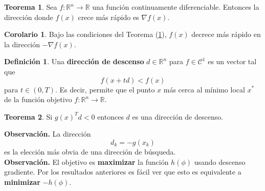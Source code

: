 \documentclass[11pt,letterpaper]{article}
\theoremstyle{definition}
\newtheorem{defi}{Definición}[section]%
\theoremstyle{definition}
\newtheorem{teo}{Teorema}[section]%
\theoremstyle{definition}
\newtheorem{col}{Corolario}[section]
\begin{document}
\begin{shaded*}
\begin{teo}\label{max_}
	Sea $ f: \mathbb{R}^n \to \mathbb{R} $ una función continuamente diferenciable. Entonces la dirección donde $ f(x) $ crece más rápido es $ \nabla f(x) $.
\end{teo}
\end{shaded*}

\begin{col}
	Bajo las condiciones del Teorema (\ref{max_}), $ f(x) $ decrece más rápido en la dirección $ - \nabla f(x) $.
\end{col}

\begin{shaded*}
\begin{defi}
	Una \textbf{dirección de descenso} $ d \in \mathbb{R}^n $ para $ f \in \mathcal{C}^1 $ es un vector tal que
	\[ f(x + t d) < f(x) \]
	para $ t \in (0, T) $. Es decir, permite que el punto $ x $ más cerca al mínimo local $ x^* $ de la función objetivo $ f: \mathbb{R}^n \to \mathbb{R} $.
\end{defi}
\end{shaded*}

\begin{shaded*}
\begin{teo}
	Si $ g(x)^T d < 0 $ entonces $ d $ es una dirección de descenso.
\end{teo}
\end{shaded*}
\textbf{Observación.} La dirección 
\[ d_k = - g(x_k) \]
es la elección más obvia de una dirección de búsqueda.
\\
\textbf{Observación.} El objetivo es \textbf{maximizar} la función $ h(\phi) $ usando descenso gradiente. Por los resultados anteriores es fácil ver que esto es equivalente a \textbf{minimizar} $ -h(\phi) $.
\end{document}
